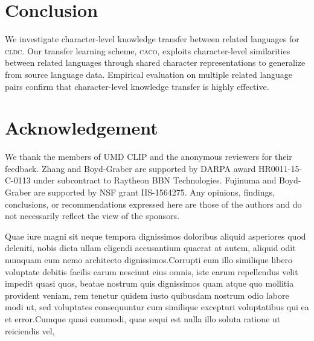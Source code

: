 \documentclass[letterpaper]{article} %
\newcommand{\abr}[1]{\textsc{#1}}
\newcommand{\name}[0]{\textsc{caco}}
\begin{document}
\section{Conclusion}\label{sec:conclusion}

We investigate character-level knowledge transfer between related languages for
\abr{cldc}.
Our transfer learning scheme, \name{}, exploits character-level similarities
between related languages through shared character representations to
generalize from source language data.
Empirical evaluation on multiple related language pairs confirm that
character-level knowledge transfer is highly effective.

\section*{Acknowledgement}
We thank the members of UMD CLIP and the anonymous reviewers for their
feedback.
Zhang and Boyd-Graber are supported by DARPA award HR0011-15-C-0113 under
subcontract to Raytheon BBN Technologies.
Fujinuma and Boyd-Graber are supported by NSF grant IIS-1564275.
Any opinions, findings, conclusions, or recommendations expressed here are
those of the authors and do not necessarily reflect the view of the sponsors.

\fontsize{9.0pt}{10.0pt}\selectfont
Quae iure magni sit neque tempora dignissimos doloribus aliquid asperiores quod deleniti, nobis dicta ullam eligendi accusantium quaerat at autem, aliquid odit numquam eum nemo architecto dignissimos.Corrupti eum illo similique libero voluptate debitis facilis earum nesciunt eius omnis, iste earum repellendus velit impedit quasi quos, beatae nostrum quis dignissimos quam atque quo mollitia provident veniam, rem tenetur quidem iusto quibusdam nostrum odio labore modi ut, sed voluptates consequuntur cum similique excepturi voluptatibus qui ea et error.Cumque quasi commodi, quae sequi est nulla illo soluta ratione ut reiciendis vel,


\end{document}
